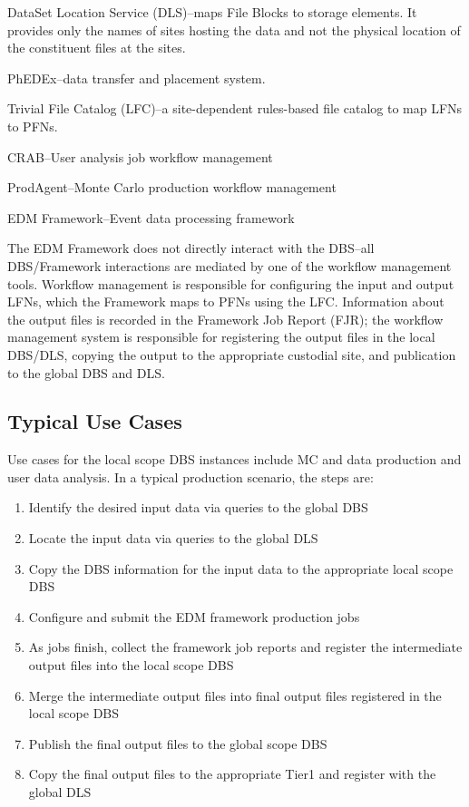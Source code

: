 \documentclass{cmspaper}
\begin{document}
\begin{description}
\item{DataSet Location Service (DLS)}--maps File Blocks to storage elements.
It provides only the  names of sites hosting the data and not the physical
location of the constituent files at the sites.
\item{PhEDEx}--data transfer and placement system.
\item{Trivial File Catalog (LFC)}--a site-dependent rules-based file catalog to map LFNs to PFNs.
\item{CRAB}--User analysis job workflow management
\item{ProdAgent}--Monte Carlo production workflow management
\item{EDM Framework}--Event data processing framework
\end{description}

The EDM Framework does not directly interact with the DBS--all
DBS/Framework interactions are mediated by one of the workflow
management tools.  Workflow management is responsible for
configuring the input and output LFNs, which the Framework
maps to PFNs using the LFC.  Information about the output
files is recorded in the Framework Job Report (FJR); the
workflow management system is responsible for registering
the output files in the local DBS/DLS, copying the output to
the appropriate custodial site, and publication to the global
DBS and DLS.

\subsection{Typical Use Cases}

Use cases for the local scope DBS instances include MC and data
production and user data analysis.  In a typical
production scenario, the steps are:

\begin{enumerate}
\item Identify the desired input data via queries to the global DBS
\item Locate the input data via queries to the global DLS
\item Copy the DBS information for the input data to the appropriate
local scope DBS
\item Configure and submit the EDM framework production jobs
\item As jobs finish, collect the framework job reports and register
the intermediate output files into the local scope DBS
\item Merge the intermediate output files into final output files
registered in the local scope DBS
\item Publish the final output files to the global scope DBS
\item Copy the final output files to the appropriate Tier1 and
register with the global DLS
\end{enumerate}
\end{document}
